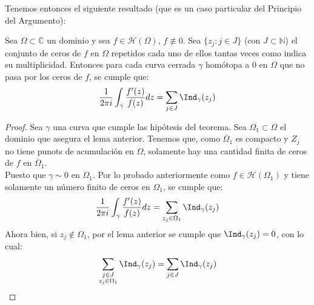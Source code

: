 Tenemos entonces el siguiente resultado (que es un caso particular del Principio del Argumento):

\begin{teorema}
    Sea $\Omega \subset \mathbb{C}$ un dominio y sea $f \in \mathcal{H}(\Omega)$, $f \not\equiv 0$. Sea $\{z_j : j \in J \}$ (con $J \subset \mathbb{N}$) el conjunto de ceros de $f$ en $\Omega$ repetidos cada uno de ellos tantas veces como indica su multiplicidad. Entonces para cada curva cerrada $\gamma$ homótopa a 0 en $\Omega$ que no pasa por los ceros de $f$, se cumple que:
    \[
        \frac{1}{2 \pi i} \int_\gamma \frac{f'(z)}{f(z)} dz =
        \sum_{j \in J} \Ind_\gamma (z_j)
    \]
\end{teorema}

\begin{proof}
    Sea $\gamma$ una curva que cumple las hipótesis del teorema. Sea $\Omega_1 \subset \Omega$ el dominio que asegura el lema anterior. Tenemos que, como $\overline{\Omega}_1$ es compacto y $Z_j$ no tiene punots de acumulación en $\Omega$, solamente hay una cantidad finita de ceros de $f$ en $\overline{\Omega}_1$.\\
    Puesto que $\gamma \sim 0$ en $\Omega_1$. Por lo probado anteriormente como $f \in \mathcal{H}(\Omega_1)$ y tiene solamente un número finito de ceros en $\Omega_1$, se cumple que:
    \[
        \frac{1}{2 \pi i} \int_\gamma \frac{f'(z)}{f(z)} dz =
        \sum_{z_j \in \Omega_1} \Ind_\gamma (z_j)
    \]
    Ahora bien, si $z_j \notin \Omega_1$, por el lema anterior se cumple que $\Ind_\gamma(z_j) = 0$, con lo cual:
    \[
        \sum_{\substack{j \in J \\ z_j \in \Omega_1}} \Ind_\gamma (z_j) = \sum_{j \in J} \Ind_\gamma(z_j)
    \]
\end{proof}

